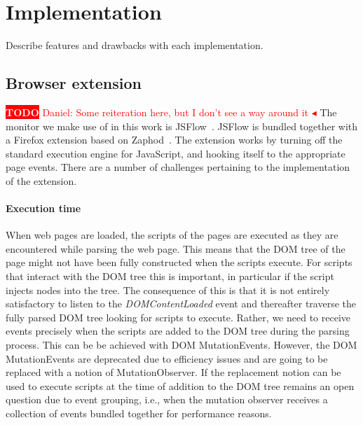 \documentclass{llncs}
\newcommand{\todo}[1]{\colorbox{red}{\textcolor{white}{\sffamily\bfseries\scriptsize TODO}} \textcolor{red}{#1} \textcolor{red}{$\blacktriangleleft$}}
\begin{document}
\section{Implementation}
\label{sec:impl}

Describe features and drawbacks with each implementation.



\subsection{Browser extension}
%
\todo{Daniel: Some reiteration here, but I don't see a way around it} The
monitor we make use of in this work is JSFlow~\cite{JSFLow}. JSFlow is bundled
together with a Firefox extension based on Zaphod~\cite{Zaphod}. The extension
works by turning off the standard execution engine for JavaScript, and hooking
itself to the appropriate page events. There are a number of challenges
pertaining to the implementation of the extension.

\paragraph{Execution time}

When web pages are loaded, the scripts of the pages are executed as they are
encountered while parsing the web page. This means that the DOM tree of the
page might not have been fully constructed when the scripts execute.  For
scripts that interact with the DOM tree this is important, in particular if the
script injects nodes into the tree. The consequence of this is that it is not
entirely satisfactory to listen to the \emph{DOMContentLoaded} event and
thereafter traverse the fully parsed DOM tree looking for scripts to execute.
Rather, we need to receive events precisely when the scripts are added to the
DOM tree during the parsing process. This can be be achieved with DOM
MutationEvents. However, the DOM MutationEvents are deprecated due to
efficiency issues and are going to be replaced with a notion of
MutationObserver.  If the replacement notion can be used to execute scripts at
the time of addition to the DOM tree remains an open question due to event
grouping, i.e., when the mutation observer receives a collection of events
bundled together for performance reasons. 
\end{document}
